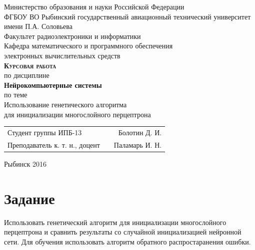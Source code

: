 \documentclass[a4paper,12pt]{article}
\begin{document}
\begin{titlepage}
\newpage


\begin{center}
	\large		
   	Министерство образования и науки Российской Федерации\\[0.5cm]
    	
	ФГБОУ ВО Рыбинский государственный авиационный технический университет имени П.А. Соловьева\\[1.0cm]

	Факультет радиоэлектроники и информатики\\[0.25cm]
		
	Кафедра математического и программного обеспечения\\ электронных вычислительных средств\\[1.5cm]
	
	\Large
	\textbf{\textsc{Курсовая работа}}\\[0.25cm]
	по  дисциплине\\
	\textbf{Нейрокомпьютерные системы}\\[0.5cm]
	
	по теме\\
	Использование генетического алгоритма \\для инициализации многослойного перцептрона
	
\end{center}

\vfill	
\begin{tabularx}{0.95\textwidth}{lXr}
Студент группы ИПБ-13 					& &	Болотин Д. И.\\

Преподаватель к. т. н., доцент			& & Паламарь И. Н.\\
\end{tabularx}

\vspace{1.5cm}
\center Рыбинск 2016
\end{titlepage}	


\newpage
\setcounter{page}{2}

\tableofcontents

\newpage\section*{Задание}
Использовать генетический алгоритм для инициализации многослойного перцептрона и сравнить результаты со случайной инициализацией нейронной сети. Для обучения использовать алгоритм обратного распростаранения ошибки.\cite{big}
\end{document}

